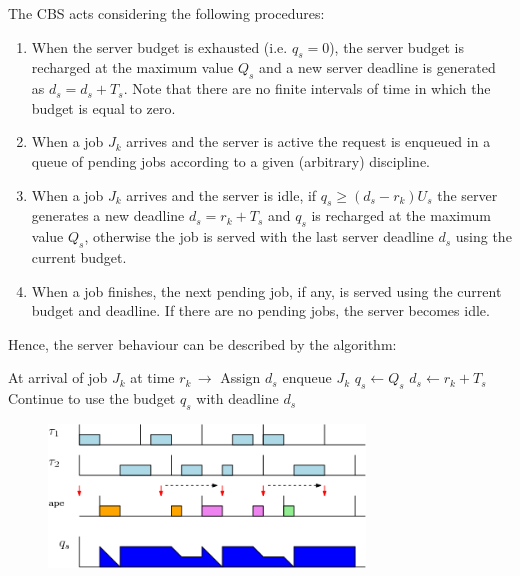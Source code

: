 The CBS acts considering the following procedures:
\begin{enumerate}
    \item When the server budget is exhausted (i.e. $q_s = 0$), the server budget is recharged at the maximum value $Q_s$ and a new server deadline is generated as $d_s = d_s + T_s$. Note that there are no finite intervals of time in which the budget is equal to zero.
    \item When a job $J_k$ arrives and the server is active the request is enqueued in a queue of pending jobs according to a given (arbitrary) discipline.
    \item When a job $J_k$ arrives and the server is idle, if $q_s \ge (d_s - r_k) U_s$ the server generates a new deadline $d_s = r_k + T_s$ and $q_s$ is recharged at the maximum value $Q_s$, otherwise the job is served with the last server deadline $d_s$ using the current budget.
    \item When a job finishes, the next pending job, if any, is served using the current budget and deadline. If there are no pending jobs, the server becomes idle.
\end{enumerate}

Hence, the server behaviour can be described by the algorithm:
\begin{algorithm}
    \begin{algorithmic}
        \STATE At arrival of job $J_k$ at time $r_k\,\rightarrow$ Assign $d_s$ 
        \STATE enqueue $J_k$
        \ELSE
        \STATE $q_s \leftarrow Q_s$       %
        \STATE $d_s \leftarrow r_k + T_s$ %
        \ELSE
        \STATE Continue to use the budget $q_s$ with deadline $d_s$
        \ENDIF
        \ENDIF
    \end{algorithmic}
\end{algorithm}

\begin{figure}[!h]
    \centering
    \includegraphics[width= 0.75\textwidth]{images/image10.png}
\end{figure}


